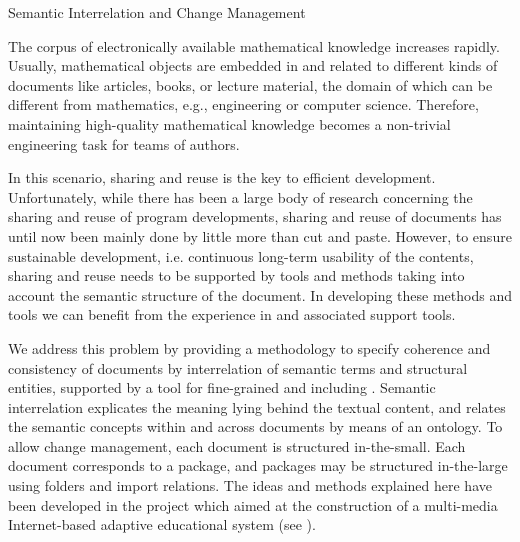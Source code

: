 
\begin{omgroup}[id=MMiSS,creators={bkb,amahnke}]
  {Semantic Interrelation and Change Management}

The corpus of electronically available mathematical knowledge increases rapidly.  Usually,
mathematical objects are embedded in and related to different kinds of documents like
articles, books, or lecture material, the domain of which can be different from
mathematics, e.g., engineering or computer science. Therefore, maintaining high-quality
mathematical knowledge becomes a non-trivial engineering task for teams of authors.

In this scenario, sharing and reuse is the
key to efficient development. Unfortunately, while there has been a large body of research
concerning the sharing and reuse of program developments, sharing and reuse of documents
has until now been mainly done by little more than cut and paste.  However, to ensure
sustainable development, i.e. continuous long-term usability of the contents, sharing and
reuse needs to be supported by tools and methods taking into account the semantic
structure of the document. In developing these methods and tools we can benefit from the
experience in {} and associated support tools.

We address this problem by providing a methodology to specify coherence and consistency of
documents by interrelation of semantic terms and structural entities, supported by a tool
for fine-grained {} and {}
including {}. Semantic
interrelation explicates the meaning lying behind the
textual content, and relates the semantic concepts within and across documents by means of
an ontology. To allow change management, each document is structured in-the-small.  Each
document corresponds to a package, and packages may be structured in-the-large using
folders and import relations. The ideas and methods explained here have been developed in
the \MMISS{} project which aimed at the construction of a multi-media Internet-based
adaptive educational system (see \cite{KriHut:MMiSS03,SemInter-DELFI04,MMISS-TechReport04}).


\end{omgroup}
